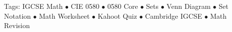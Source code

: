 \documentclass[11pt,a4paper]{article}
\begin{document}
\vspace{14pt}
\begin{center}
  \sffamily\scriptsize\textcolor{textmuted}{
    Tags: IGCSE Math $\bullet$ CIE 0580 $\bullet$ 0580 Core $\bullet$ Sets $\bullet$ Venn Diagram $\bullet$ Set Notation $\bullet$ Math Worksheet $\bullet$ Kahoot Quiz $\bullet$ Cambridge IGCSE $\bullet$ Math Revision
  }
\end{center}
\end{document}
